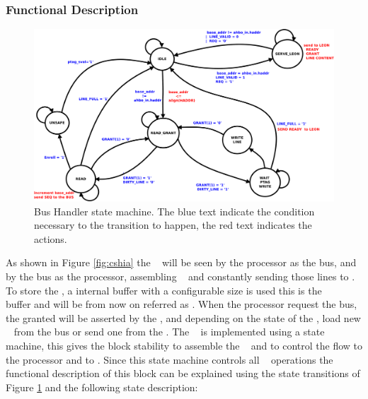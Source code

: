 \subsubsection{Functional Description}

\begin{figure}[!ht]
	\centering
	\includegraphics[scale=0.25]{figures/pdf/sec_hand_state_machine.pdf}
    \caption{Bus Handler state machine. The blue text indicate the condition necessary to the transition to happen, the red text indicates the \handler~ actions.   }
	\label{fig:phsm}
\end{figure}

As shown in Figure \ref{fig:cshia} the \handler~ will  be seen  by the processor as the bus, and by the bus as the processor, assembling \slines~  and constantly sending those lines to \seceng.  To store the \slines, a internal buffer with a configurable size is used this is the \handler~ \sline~ buffer and will be from now on referred as \sbuf.  When the processor request the bus, the granted will be asserted by the \handler, and depending on the state of the \sbuf, load new \slines~ from the bus or send one from the \sbuf. The \handler~ is  implemented using a state machine, this gives the block stability  to assemble the \sline~ and to control the flow to the processor and to \seceng. Since this state machine controls all \handler~ operations the functional  description of this block can be explained using the state transitions  of Figure \ref{fig:phsm} and the following state description:

